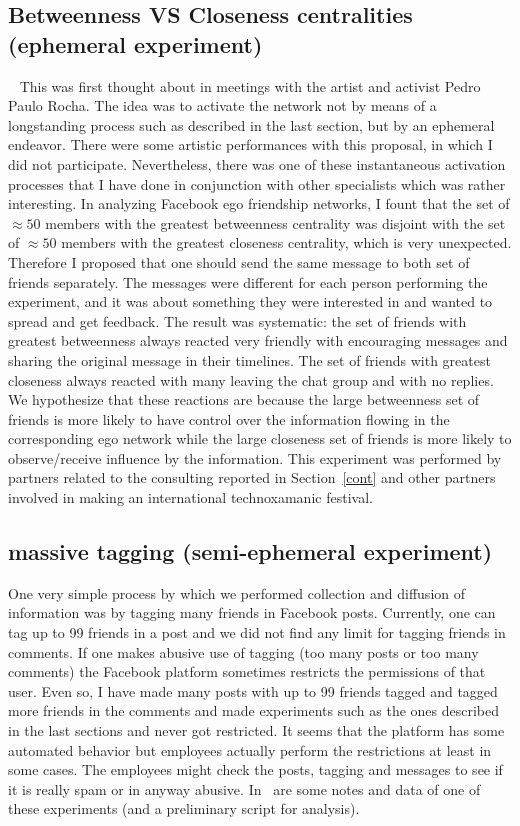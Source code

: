 \documentclass[a4paper]{article}
\begin{document}
\subsection{Betweenness VS Closeness centralities (ephemeral experiment)}~\label{eph}
This was first thought about in meetings with the artist and activist Pedro Paulo Rocha.
The idea was to activate the network not by means of a longstanding process such
as described in the last section, but by an ephemeral endeavor.
There were some artistic performances with this proposal, in which I did
not participate.
Nevertheless, there was one of these instantaneous activation processes that
I have done in conjunction with other specialists which was rather interesting.
In analyzing Facebook ego friendship networks, I fount that the set of $\approx 50$ members with
the greatest betweenness centrality was disjoint with the set of $\approx 50$ members
with the greatest closeness centrality, which is very unexpected.
Therefore I proposed that one should send the same message to both set of friends separately.
The messages were different for each person performing the experiment,
and it was about something they were interested in and wanted to spread and get feedback.
The result was systematic: the set of friends with greatest betweenness always reacted very friendly
with encouraging messages and sharing the original message in their timelines.
The set of friends with greatest closeness always reacted with many leaving the chat group
and with no replies.
We hypothesize that these reactions are because the large betweenness set of friends is more
likely to have control over the information flowing in the corresponding ego network while
the large closeness set of friends is more likely to observe/receive influence by the information.
This experiment was performed by partners related to the consulting reported in Section~\ref{cont}
and other partners involved in making an international technoxamanic festival.

\subsection{massive tagging (semi-ephemeral experiment)}
One very simple process by which we performed collection and diffusion of information
was by tagging many friends in Facebook posts.
Currently, one can tag up to 99 friends in a post
and we did not find any limit for tagging friends in comments.
If one makes abusive use of tagging (too many posts or too many comments)
the Facebook platform sometimes restricts the permissions of that user.
Even so, I have made many posts with up to 99 friends tagged and tagged more
friends in the comments and made experiments such as the ones described in the
last sections and never got restricted.
It seems that the platform has some automated behavior but employees actually
perform the restrictions at least in some cases.
The employees might check the posts, tagging and messages to see if it is
really spam or in anyway abusive.
In~\cite{anExp} are some notes and data of one of these experiments (and a preliminary script for analysis).
\end{document}
